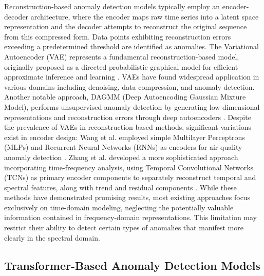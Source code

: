 \documentclass[sigconf]{acmart}
\begin{document}
Reconstruction-based anomaly detection models typically employ an encoder-decoder architecture, 
where the encoder maps raw time series into a latent space representation and the decoder attempts 
to reconstruct the original sequence from this compressed form. Data points exhibiting reconstruction 
errors exceeding a predetermined threshold are identified as anomalies.
The Variational Autoencoder (VAE) represents a fundamental reconstruction-based model, 
originally proposed as a directed probabilistic graphical model for efficient approximate inference and learning \cite{kingma2013auto}. 
VAEs have found widespread application in various domains including denoising, data compression, and anomaly detection.
Another notable approach, DAGMM (Deep Autoencoding Gaussian Mixture Model), performs unsupervised anomaly detection 
by generating low-dimensional representations and reconstruction errors through deep autoencoders \cite{zong2018deep}.
Despite the prevalence of VAEs in reconstruction-based methods, significant variations exist in encoder design:
Wang et al. employed simple Multilayer Perceptrons (MLPs) and Recurrent Neural Networks (RNNs) as encoders for air quality anomaly detection \cite{wang2019quality}.
Zhang et al. developed a more sophisticated approach incorporating time-frequency analysis, using Temporal 
Convolutional Networks (TCNs) as primary encoder components to separately reconstruct temporal and spectral features, 
along with trend and residual components \cite{zhang2022tfad}.
While these methods have demonstrated promising results, most existing approaches focus exclusively on time-domain modeling, 
neglecting the potentially valuable information contained in frequency-domain representations. 
This limitation may restrict their ability to detect certain types of anomalies that manifest more clearly in the spectral domain.

\subsection{Transformer-Based Anomaly Detection Models}
\end{document}
